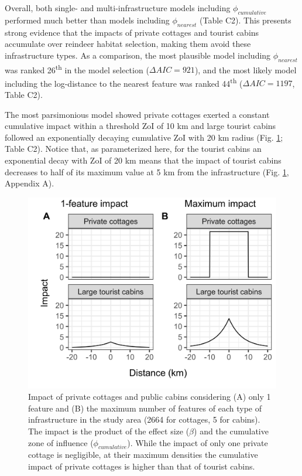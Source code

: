 \documentclass[titlepage]{article}
\begin{document}
Overall, both single- and multi-infrastructure models including $\phi_{cumulative}$ performed much better than models including $\phi_{nearest}$ (Table C2). This presents strong evidence that the impacts of private cottages and tourist cabins accumulate over reindeer habitat selection, making them avoid these infrastructure types. As a comparison, the most plausible model including $\phi_{nearest}$ was ranked 26\textsuperscript{th} in the model selection ($\Delta AIC = 921$), and the most likely model including the log-distance to the nearest feature was ranked 44\textsuperscript{th} ($\Delta AIC = 1197$, Table C2).

The most parsimonious model showed private cottages exerted a constant cumulative impact within a threshold ZoI of 10 km and large tourist cabins followed an exponentially decaying cumulative ZoI with 20 km radius (Fig. \ref{fig:impact_plot}; Table C2). Notice that, as parameterized here, for the tourist cabins an exponential decay with ZoI of 20 km means
that the impact of tourist cabins decreases to half of its maximum value
at 5 km from the infrastructure (Fig. \ref{fig:impact_plot}, Appendix A). 

\begin{figure}[h]
\centering
\includegraphics[width=1\textwidth,center]{figures/reindeer_zoi_impact_single_multiple_features.png}
\caption{\label{fig:impact_plot} Impact of private cottages and public cabins considering (A) only 1 feature and (B) the maximum number of features of each type of infrastructure in the study area (2664 for cottages, 5 for cabins). The impact is the product of the effect size ($\beta$) and the cumulative zone of influence ($\phi_{cumulative}$). While the impact of only one private cottage is negligible, at their maximum densities the cumulative impact of private cottages is higher than that of tourist cabins.}
\end{figure}
\end{document}
